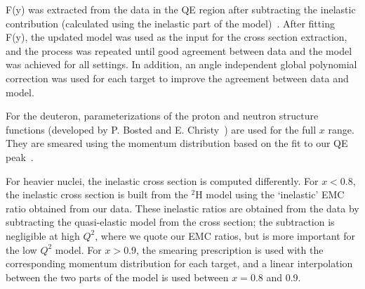 %

F(y) was extracted from the data in the QE region after subtracting the
inelastic contribution (calculated using the inelastic part of the
model)~\cite{nadia_thesis}. After fitting F(y), the updated model was used as
the input for the cross section extraction, and the process was repeated until
good agreement between data and the model was achieved for all settings. In
addition, an angle independent global polynomial correction was used for each
target to improve the agreement between data and model. 


For the deuteron, parameterizations of the proton and neutron structure
functions (developed by P. Bosted and E. Christy~\cite{bosted_model}) are used
for the full $x$ range. They are smeared using the momentum distribution based
on the fit to our QE peak~\cite{nadia_thesis}.

For heavier nuclei, the inelastic cross section is computed differently. For
$x<0.8$, the inelastic cross section is built from the $^2$H model using the
`inelastic' EMC ratio obtained from our data. These inelastic ratios
are obtained from the data by subtracting the quasi-elastic
model from the cross section; the subtraction is negligible at high $Q^2$, 
where we quote our EMC ratios, but is more important for the low $Q^2$ model.
For $x>0.9$, the smearing prescription is used with the corresponding momentum
distribution for each target, and a linear interpolation between the two
parts of the model is used between $x=0.8$ and 0.9.


